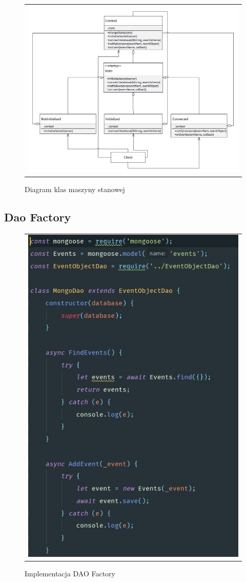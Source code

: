 \documentclass{sprawozdanie-agh}
\begin{document}
	\begin{figure}[H] 
		\centering
		\begin{tabular}{c}
			\includegraphics[width=.99\textwidth]{statemachineclass}
		\end{tabular} 
		\caption{Diagram klas maszyny stanowej}
	\end{figure}

	\subsection{Dao Factory}
	
	\begin{figure}[H] 
		\centering
		\begin{tabular}{c}
			\includegraphics[width=.75\textwidth]{mongodao}
		\end{tabular} 
		\caption{Implementacja DAO Factory}
	\end{figure}
\end{document}
